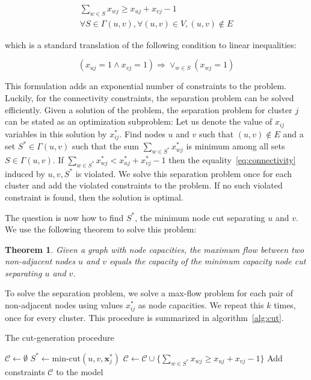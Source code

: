 \documentclass[conference,compsoc]{IEEEtran}
\newtheorem{theorem}{Theorem}
\begin{document}
\begin{multline}
\sum_{w \in S} x_{wj} \geq x_{uj} + x_{vj} - 1 \\
\forall S \in \Gamma(u, v), \forall (u, v) \in V, (u, v) \notin E
\label{eq:connectivity}
\end{multline}

which is a standard translation of the following condition to linear inequalities:

\begin{equation*}
(x_{uj}=1 \land x_{vj}=1) \Rightarrow \lor_{w \in S} (x_{wj}=1)
\end{equation*}

This formulation adds an exponential number of constraints to the problem. Luckily, for the connectivity constraints, the separation problem can be
solved efficiently. Given a solution of the problem, the
separation problem for cluster $j$ can be stated as an optimization subproblem: Let us denote the value of $x_{ij}$ variables in this solution by $x^*_{ij}$. Find nodes $u$ and $v$ such that $(u, v) \notin E$ and a set $S^* \in \Gamma(u, v)$ such that the sum $\sum_{w \in S^*} x_{wj}^*$ is
minimum among all sets $S \in \Gamma(u, v)$. If $\sum_{w \in S^*} x_{wj}^* < x^*_{uj} + x^*_{vj} - 1$ then the equality~\ref{eq:connectivity}
induced by $u, v, S^*$ is violated. We solve this separation problem
once for each cluster and add the violated constraints to the problem.
If no such violated constraint is found, then the solution is optimal.

The question is now how to find $S^*$, the minimum node cut separating
$u$ and $v$. We use the following theorem to solve this problem:

\begin{theorem}
Given a graph with node capacities, the maximum flow between
two non-adjacent nodes $u$ and $v$ equals the capacity of the minimum
capacity node cut separating $u$ and $v$.
\end{theorem}

To solve the separation problem, we solve a max-flow problem for each
pair of non-adjacent nodes using values $x^*_{ij}$ as node capacities. We repeat this $k$ times, once for every cluster. This procedure is summarized in algorithm~\ref{alg:cut}.

\begin{algorithm}
\centering
\caption{The cut-generation procedure}
\label{alg:cut}
\begin{algorithmic}[1]
\State $\mathcal{C} \gets \emptyset$
		\State $S^* \gets \text{min-cut}(u, v, {\mathbf{x}}^{*}_j)$ 
			\State $\mathcal{C} \gets \mathcal{C} \cup \{\sum_{w \in S^*} x_{wj} \geq x_{uj} + x_{vj} - 1\}$
		\EndIf
	\EndFor
\EndFor
\State Add constraints $\mathcal{C}$ to the model
\end{algorithmic}
\end{algorithm}
\end{document}
